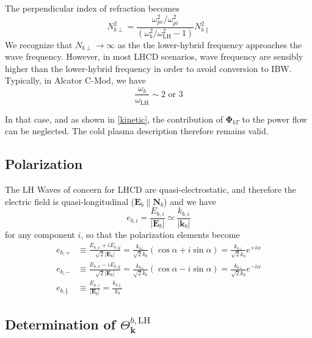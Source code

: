 The perpendicular index of refraction becomes
\begin{equation}
N_{b\perp}^{2}=\frac{\omega_{pe}^{2}/\omega_{pi}^{2}}{\left(  \omega_{b}%
^{2}/\omega_{\text{LH}}^{2}-1\right)  }N_{b\parallel}^{2} \label{nperplh2}%
\end{equation}
We recognize that $N_{b\perp}\rightarrow\infty$ as the the lower-hybrid
frequency approaches the wave frequency. However, in most LHCD scenarios, wave
frequency are sensibly higher than the lower-hybrid frequency in order to
avoid conversion to IBW. Typically, in Alcator C-Mod, we have
\begin{equation}
\frac{\omega_{b}}{\omega_{\text{LH}}}\sim2\text{ or }3
\end{equation}

In that case, and as shown in \ref{kinetic}, the contribution of
$\mathbf{\Phi}_{bT}$ to the power flow can be neglected. The cold plasma
description therefore remains valid.

\subsection{Polarization}

The LH Waves of concern for LHCD are quasi-electrostatic, and therefore the
electric field is quasi-longitudinal ($\mathbf{E}_{b}\parallel\mathbf{N}_{b}$)
and we have
\begin{equation}
e_{b,i}=\frac{E_{b,i}}{\left|  \mathbf{E}_{b}\right|  }\simeq\frac{k_{b,i}%
}{\left|  \mathbf{k}_{b}\right|  }%
\end{equation}
for any component $i$, so that the polarization elements become
\begin{align}
e_{b,+}  &  \equiv\frac{E_{b,x}+iE_{b,y}}{\sqrt{2}\left|  \mathbf{E}%
_{b}\right|  }=\frac{k_{b\bot}}{\sqrt{2}k_{b}}\left(  \cos\alpha+i\sin
\alpha\right)  =\frac{k_{b\bot}}{\sqrt{2}k_{b}}e^{+i\alpha}\label{pollh}\\
e_{b,-}  &  \equiv\frac{E_{b,x}-iE_{b,y}}{\sqrt{2}\left|  \mathbf{E}%
_{b}\right|  }=\frac{k_{b\bot}}{\sqrt{2}k_{b}}\left(  \cos\alpha-i\sin
\alpha\right)  =\frac{k_{b\bot}}{\sqrt{2}k_{b}}e^{-i\alpha}\nonumber\\
e_{b,\Vert}  &  \equiv\frac{E_{b,z}}{\left|  \mathbf{E}_{b}\right|  }%
=\frac{k_{b\parallel}}{k_{b}}\nonumber
\end{align}

\subsection{Determination of $\Theta_{\mathbf{k}}^{b,\text{LH}}$}

